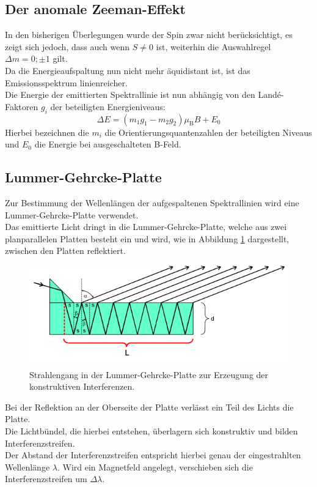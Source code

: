 \subsection{Der anomale Zeeman-Effekt}
In den bisherigen Überlegungen wurde der Spin zwar nicht berücksichtigt, es zeigt sich jedoch, dass auch wenn $S\neq 0$ ist, weiterhin die Auswahlregel $\Delta m=0 ; \pm 1$ gilt.\\
Da die Energieaufspaltung nun nicht mehr äquidistant ist, ist das Emissionsspektrum linienreicher.\\
Die Energie der emittierten Spektrallinie ist nun abhängig von den Landé-Faktoren $g_i$ der beteiligten Energieniveaus:
\begin{equation}
  \label{eqn:anom}
  \Delta E=\left(m_1g_1-m_2g_2\right)\mu_{\mathrm{B}}B+E_0
\end{equation}
Hierbei bezeichnen die $m_i$ die Orientierungsquantenzahlen der beteiligten Niveaus und $E_0$ die Energie bei ausgeschalteten B-Feld.

\subsection{Lummer-Gehrcke-Platte}
Zur Bestimmung der Wellenlängen der aufgespaltenen Spektrallinien wird eine Lummer-Gehrcke-Platte verwendet.\\
Das emittierte Licht dringt in die Lummer-Gehrcke-Platte, welche aus zwei planparallelen Platten besteht ein und wird, wie in Abbildung \ref{fig:lummer} dargestellt, zwischen den Platten reflektiert.\\
\begin{figure}
  \centering
  \includegraphics[width=0.7\columnwidth]{pictures/lummer.png}
  \caption{Strahlengang in der Lummer-Gehrcke-Platte zur Erzeugung der konstruktiven Interferenzen.\cite{Anleitung}}
  \label{fig:lummer}
\end{figure}
Bei der Reflektion an der Oberseite der Platte verlässt ein Teil des Lichts die Platte.\\
Die Lichtbündel, die hierbei entstehen, überlagern sich konstruktiv und bilden Interferenzstreifen.\\ Der Abstand der Interferenzstreifen entspricht hierbei genau der eingestrahlten Wellenlänge $\lambda$.
Wird ein Magnetfeld angelegt, verschieben sich die Interferenzstreifen um $\Delta \lambda$.\\

